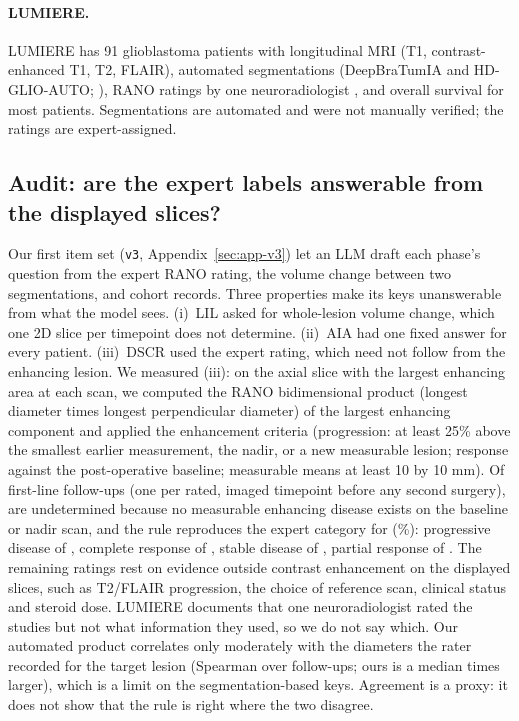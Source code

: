 \paragraph{LUMIERE.} LUMIERE \citep{suter2022lumiere} has 91 glioblastoma patients with longitudinal MRI (T1, contrast-enhanced T1, T2, FLAIR), automated segmentations (DeepBraTumIA and HD-GLIO-AUTO; \citealp{suter2022lumiere, kickingereder2019automated}), RANO ratings by one neuroradiologist \citep{wen2010updated}, and overall survival for most patients. Segmentations are automated and were not manually verified; the ratings are expert-assigned.

\subsection{Audit: are the expert labels answerable from the displayed slices?}
\label{sec:audit}

Our first item set (\texttt{v3}, Appendix~\ref{sec:app-v3}) let an LLM draft each phase's question from the expert RANO rating, the volume change between two segmentations, and cohort records. Three properties make its keys unanswerable from what the model sees. (i)~LIL asked for whole-lesion volume change, which one 2D slice per timepoint does not determine. (ii)~AIA had one fixed answer for every patient. (iii)~DSCR used the expert rating, which need not follow from the enhancing lesion. We measured (iii): on the axial slice with the largest enhancing area at each scan, we computed the RANO bidimensional product (longest diameter times longest perpendicular diameter) of the largest enhancing component and applied the enhancement criteria (progression: at least 25\% above the smallest earlier measurement, the nadir, or a new measurable lesion; response against the post-operative baseline; measurable means at least 10 by 10 mm). Of \vfourFollowups{} first-line follow-ups (one per rated, imaged timepoint before any second surgery), \vfourUndetermined{} are undetermined because no measurable enhancing disease exists on the baseline or nadir scan, and the rule reproduces the expert category for \vfourConcordant{} (\vfourConcordantPct{}\%): progressive disease \vfourExpPDSame{} of \vfourExpPDN{}, complete response \vfourExpCRSame{} of \vfourExpCRN{}, stable disease \vfourExpSDSame{} of \vfourExpSDN{}, partial response \vfourExpPRSame{} of \vfourExpPRN{}. The remaining ratings rest on evidence outside contrast enhancement on the displayed slices, such as T2/FLAIR progression, the choice of reference scan, clinical status and steroid dose. LUMIERE documents that one neuroradiologist rated the studies but not what information they used, so we do not say which. Our automated product correlates only moderately with the diameters the rater recorded for the target lesion (Spearman \vfourBpRho{} over \vfourBpN{} follow-ups; ours is a median \vfourBpRatio{} times larger), which is a limit on the segmentation-based keys. Agreement is a proxy: it does not show that the rule is right where the two disagree.

